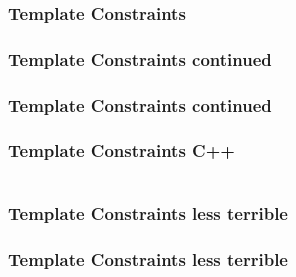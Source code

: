 \documentclass[aspectratio=169,notes]{beamer}
\begin{document}
	\begin{frame}[t]
		\frametitle{Template Constraints}
		
	\end{frame}

	\begin{frame}[t]
		\frametitle{Template Constraints continued}
		
	\end{frame}

	\begin{frame}[t]
		\frametitle{Template Constraints continued}
		
	\end{frame}

	\begin{frame}[t]
		\frametitle{Template Constraints C++}
		\begin{columns}[T]
		\begin{column}{0.49\textwidth}
		
		\end{column}
		\begin{column}{0.49\textwidth}
		
		\end{column}
		\end{columns}
	\end{frame}

	\begin{frame}[t]
		\frametitle{Template Constraints less terrible}
		
	\end{frame}

	\begin{frame}[t]
		\frametitle{Template Constraints less terrible}
		
	\end{frame}
\end{document}
